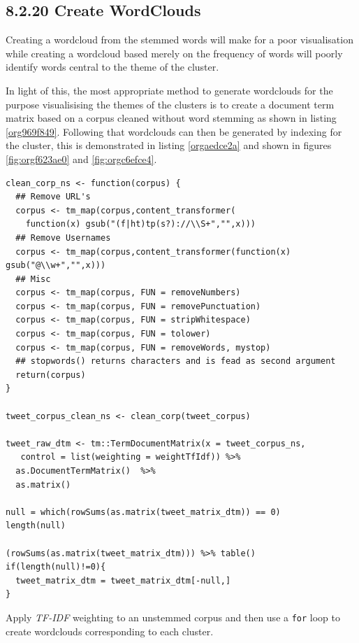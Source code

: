 \documentclass[11pt]{article}
\begin{document}
\subsection{8.2.20 Create WordClouds}
\label{sec:org102fe35}
Creating a wordcloud from the stemmed words will make for a poor visualisation
while creating a wordcloud based merely on the frequency of words will poorly
identify words central to the theme of the cluster.

In light of this, the most appropriate method to generate wordclouds for the
purpose visualisising the themes of the clusters is to create a document term
matrix based on a corpus cleaned without word stemming as shown in listing \ref{org969f849}.
Following that wordclouds can then be generated by indexing for the cluster,
this is demonstrated in listing \ref{orgaedce2a} and shown in figures \ref{fig:orgf623ae0} and \ref{fig:orgc6efce4}.


\begin{listing}[htbp]
\begin{verbatim}
clean_corp_ns <- function(corpus) {
  ## Remove URL's
  corpus <- tm_map(corpus,content_transformer(
    function(x) gsub("(f|ht)tp(s?)://\\S+","",x)))
  ## Remove Usernames
  corpus <- tm_map(corpus,content_transformer(function(x) gsub("@\\w+","",x)))
  ## Misc
  corpus <- tm_map(corpus, FUN = removeNumbers)
  corpus <- tm_map(corpus, FUN = removePunctuation)
  corpus <- tm_map(corpus, FUN = stripWhitespace)
  corpus <- tm_map(corpus, FUN = tolower)
  corpus <- tm_map(corpus, FUN = removeWords, mystop)
  ## stopwords() returns characters and is fead as second argument
  return(corpus)
}

tweet_corpus_clean_ns <- clean_corp(tweet_corpus)

tweet_raw_dtm <- tm::TermDocumentMatrix(x = tweet_corpus_ns,
   control = list(weighting = weightTfIdf)) %>%
  as.DocumentTermMatrix()  %>%
  as.matrix()

null = which(rowSums(as.matrix(tweet_matrix_dtm)) == 0)
length(null)

(rowSums(as.matrix(tweet_matrix_dtm))) %>% table()
if(length(null)!=0){
  tweet_matrix_dtm = tweet_matrix_dtm[-null,]
}

\end{verbatim}
\caption{\label{org969f849}Apply \emph{TF-IDF} weighting to an unstemmed corpus and then use a \texttt{for} loop to create wordclouds corresponding to each cluster.}
\end{listing}
\end{document}
